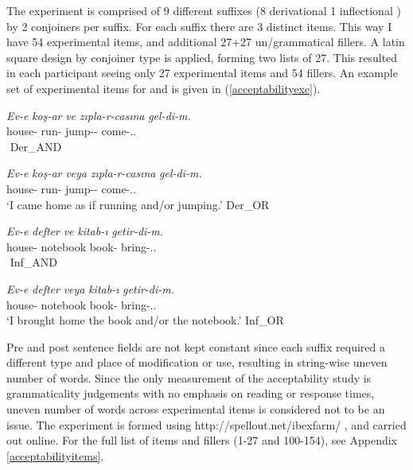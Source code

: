 The experiment is comprised of 9 different suffixes (8 derivational 1 inflectional {\Acc}) by 2 conjoiners per suffix. For each suffix there are 3 distinct items. This way I have 54 experimental items, and additional 27+27 un/grammatical fillers. A latin square design by conjoiner type is applied, forming two lists of 27. This resulted in each participant seeing only 27 experimental items and 54 fillers. An example set of experimental items for {\Acc} and {\Casina} is given in (\ref{acceptabilityexe}).

\begin{exe}
    \ex \label{acceptabilityexe}
    \begin{xlist}
    \ex \gll \textit{Ev-e} \textit{koş-ar} \textit{ve} \textit{zıpla-r-casına} \textit{gel-di-m.} \\ house-{\Dat} run-{\Aor} {\And} jump-{\Aor}-{\Casina} come-{\Pst}.{\First}.{\Sg} \\
    \glt ${}$ \hfill Der\_AND

    \ex \gll \textit{Ev-e} \textit{koş-ar} \textit{veya} \textit{zıpla-r-casına} \textit{gel-di-m.} \\ house-{\Dat} run-{\Aor} {\Or} jump-{\Aor}-{\Casina} come-{\Pst}.{\First}.{\Sg} \\
    \glt `I came home as if running and/or jumping.' \hfill Der\_OR
 
    \ex \gll \textit{Ev-e} \textit{defter} \textit{ve} \textit{kitab-ı} \textit{getir-di-m.} \\ house-{\Dat} notebook {\And} book-{\Acc} bring-{\Pst}.{\First}.{\Sg} \\
    \glt ${}$ \hfill Inf\_AND
    
    \ex \gll \textit{Ev-e} \textit{defter} \textit{veya} \textit{kitab-ı} \textit{getir-di-m.} \\ house-{\Dat} notebook {\Or} book-{\Acc} bring-{\Pst}.{\First}.{\Sg} \\
    \glt `I brought home the book and/or the notebook.' \hfill Inf\_OR
    \end{xlist}
\end{exe}

Pre and post sentence fields are not kept constant since each suffix required a different type and place of modification or use, resulting in string-wise uneven number of words. Since the only measurement of the acceptability study is grammaticality judgements with no emphasis on reading or response times, uneven number of words across experimental items is considered not to be an issue. The experiment is formed using http://spellout.net/ibexfarm/ \citep{drummond2013ibex}, and carried out online. For the full list of items and fillers (1-27 and 100-154), see Appendix \ref{acceptabilityitems}.


